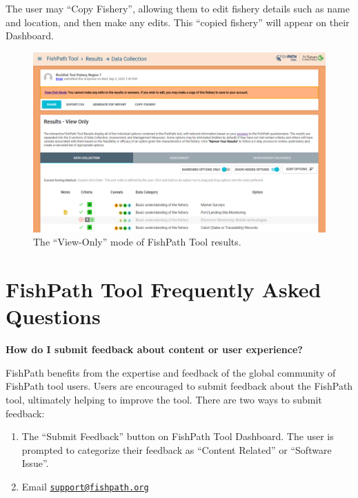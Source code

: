 \documentclass[
  11pt,
]{book}
\providecommand{\tightlist}{%
  \setlength{\itemsep}{0pt}\setlength{\parskip}{0pt}}
\begin{document}
The user may ``Copy Fishery'', allowing them to edit fishery details such as name and location, and then make any edits. This ``copied fishery'' will appear on their Dashboard.

\begin{figure}

{\centering \includegraphics[width=0.95\linewidth]{images/view-only} 

}

\caption{The “View-Only” mode of FishPath Tool results.}\label{fig:view-only}
\end{figure}

\hypertarget{appendix-appendix}{%
\appendix}


\hypertarget{fishpath-tool-frequently-asked-questions}{%
\chapter{FishPath Tool Frequently Asked Questions}\label{fishpath-tool-frequently-asked-questions}}

\textbf{How do I submit feedback about content or user experience?}

FishPath benefits from the expertise and feedback of the global community of FishPath tool users. Users are encouraged to submit feedback about the FishPath tool, ultimately helping to improve the tool. There are two ways to submit feedback:

\begin{enumerate}
\def\labelenumi{\arabic{enumi}.}
\tightlist
\item
  The ``Submit Feedback'' button on FishPath Tool Dashboard. The user is prompted to categorize their feedback as ``Content Related'' or ``Software Issue''.
\item
  Email \href{mailto:support@fishpath.org}{\nolinkurl{support@fishpath.org}}
\end{enumerate}
\end{document}
